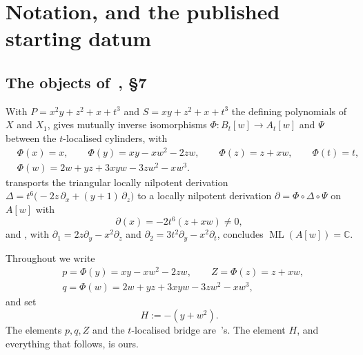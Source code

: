 \documentclass[11pt]{article}
\theoremstyle{definition}
\theoremstyle{remark}
\newcommand{\C}{\mathbb{C}}
\newcommand{\ML}{\operatorname{ML}}
\begin{document}
\section{Notation, and the published starting datum}\label{sec:prelim}

\subsection{The objects of~\cite{DMJP2009}, \S7}

With $P=x^2y+z^2+x+t^3$ and $S=xy+z^2+x+t^3$ the defining polynomials of $X$
and $X_1$, \cite[Prop.~7.1]{DMJP2009} gives mutually inverse isomorphisms
$\Phi\colon B_t[w]\to A_t[w]$ and $\Psi$ between the $t$-localised cylinders,
with
\begin{equation}\label{eq:Phi}
\begin{aligned}
&\Phi(x)=x,\qquad \Phi(y)=xy-xw^2-2zw,\qquad \Phi(z)=z+xw,\qquad \Phi(t)=t,\\
&\Phi(w)=2w+yz+3xyw-3zw^2-xw^3 .
\end{aligned}
\end{equation}
\cite[Prop.~7.2]{DMJP2009} transports the triangular locally nilpotent
derivation $\Delta=t^6\bigl(-2z\,\partial_x+(y+1)\,\partial_z\bigr)$ to a
locally nilpotent derivation $\partial=\Phi\circ\Delta\circ\Psi$ on $A[w]$
with
\begin{equation}\label{eq:dx}
\partial(x)=-2t^6(z+xw)\ne0 ,
\end{equation}
and \cite[Cor.~7.3]{DMJP2009}, with $\partial_1=2z\partial_y-x^2\partial_z$
and $\partial_2=3t^2\partial_y-x^2\partial_t$, concludes $\ML(A[w])=\C$.

Throughout we write
\begin{equation}\label{eq:pqZ}
\begin{aligned}
&p=\Phi(y)=xy-xw^2-2zw,\qquad
Z=\Phi(z)=z+xw,\\
&q=\Phi(w)=2w+yz+3xyw-3zw^2-xw^3,
\end{aligned}
\end{equation}
and set
\begin{equation}\label{eq:H}
H := -(y+w^2).
\end{equation}
The elements $p,q,Z$ and the $t$-localised bridge are~\cite{DMJP2009}'s. The
element $H$, and everything that follows, is ours.
\end{document}
